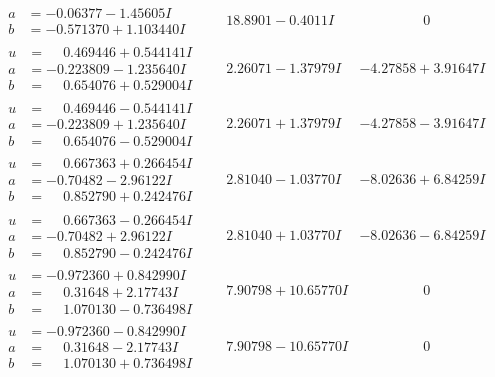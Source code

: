 \documentclass[1p]{elsarticle_modified}
\theoremstyle{definition}
\begin{document}
$$\begin{array}{c|c|c}
\begin{aligned}
a &= -0.06377 - 1.45605 I \\
b &= -0.571370 + 1.103440 I\end{aligned}
 & \phantom{-}18.8901 - 0.4011 I & \phantom{-0.000000 } 0 \\ \hline\begin{aligned}
u &= \phantom{-}0.469446 + 0.544141 I \\
a &= -0.223809 - 1.235640 I \\
b &= \phantom{-}0.654076 + 0.529004 I\end{aligned}
 & \phantom{-}2.26071 - 1.37979 I & -4.27858 + 3.91647 I \\ \hline\begin{aligned}
u &= \phantom{-}0.469446 - 0.544141 I \\
a &= -0.223809 + 1.235640 I \\
b &= \phantom{-}0.654076 - 0.529004 I\end{aligned}
 & \phantom{-}2.26071 + 1.37979 I & -4.27858 - 3.91647 I \\ \hline\begin{aligned}
u &= \phantom{-}0.667363 + 0.266454 I \\
a &= -0.70482 - 2.96122 I \\
b &= \phantom{-}0.852790 + 0.242476 I\end{aligned}
 & \phantom{-}2.81040 - 1.03770 I & -8.02636 + 6.84259 I \\ \hline\begin{aligned}
u &= \phantom{-}0.667363 - 0.266454 I \\
a &= -0.70482 + 2.96122 I \\
b &= \phantom{-}0.852790 - 0.242476 I\end{aligned}
 & \phantom{-}2.81040 + 1.03770 I & -8.02636 - 6.84259 I \\ \hline\begin{aligned}
u &= -0.972360 + 0.842990 I \\
a &= \phantom{-}0.31648 + 2.17743 I \\
b &= \phantom{-}1.070130 - 0.736498 I\end{aligned}
 & \phantom{-}7.90798 + 10.65770 I & \phantom{-0.000000 } 0 \\ \hline\begin{aligned}
u &= -0.972360 - 0.842990 I \\
a &= \phantom{-}0.31648 - 2.17743 I \\
b &= \phantom{-}1.070130 + 0.736498 I\end{aligned}
 & \phantom{-}7.90798 - 10.65770 I & \phantom{-0.000000 } 0\\

\end{array}$$
\end{document}
